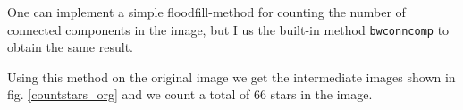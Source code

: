 \documentclass[a4paper, 10pt, final]{article}
\begin{document}
One can implement a simple floodfill-method for counting the number of
connected components in the image, but I us the built-in method
\texttt{bwconncomp} to obtain the same result.

Using this method on the original image we get the intermediate images
shown in fig.  \ref{countstars_org} and we count a total of 66 stars in
the image.

\begin{figure}[!h]
    \centering
    \hspace{1em}
    \\
    \hspace{1em}

\end{figure}
\end{document}
